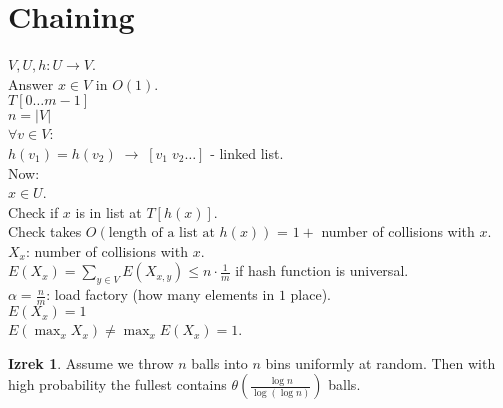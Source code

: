 \documentclass[a4paper, 12pt]{book}
\theoremstyle{definition}
\newtheorem{theorem}[counter]{Izrek}
\theoremstyle{remark}
\begin{document}
\section{Chaining}

$V, U, h: U \to V$. \\
Answer $x \in V$ in $O(1)$. \\
$T[0 \dots m-1]$ \\
$n = |V|$ \\
$\forall v \in V$: \\
$h(v_1) = h(v_2) \; \to \; [v_1 \; v_2 \dots]$ - linked list. \\
Now: \\
$x \in U$. \\
Check if $x$ is in list at $T[h(x)]$. \\
Check takes $O(\text{length of a list at }h(x))$ = $1 +$ number of collisions with $x$. \\
$X_x$: number of collisions with $x$. \\
$E(X_x) = \sum_{y \in V} E(X_{x,y}) \leq n \cdot \frac{1}{m}$ if hash function is universal. \\
$\alpha = \frac{n}{m}$: load factory (how many elements in $1$ place). \\
$E(X_x) = 1$ \\
$E(\max_x X_x) \neq \max_x E(X_x) = 1$.
\begin{theorem}
  Assume we throw $n$ balls into $n$ bins uniformly at random.
  Then with high probability the fullest contains
  $\theta\left(\frac{\log n}{\log (\log n)}\right)$ balls.
\end{theorem}
\end{document}
